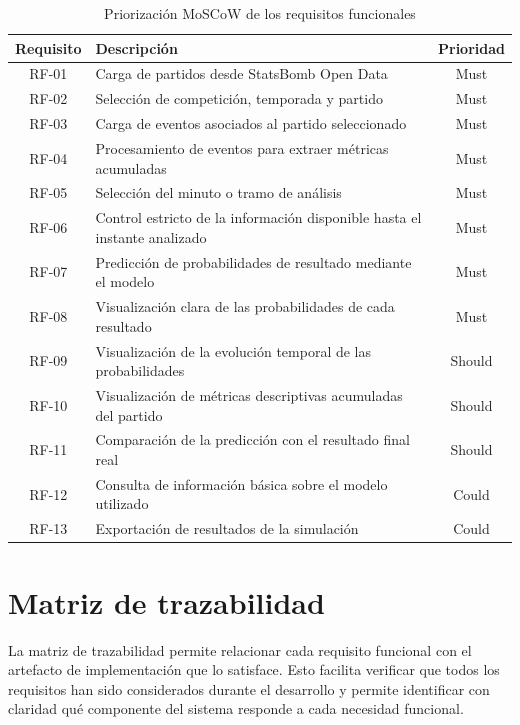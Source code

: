 \begin{table}[H]
    \centering
    \begin{tabularx}{\textwidth}{|c|X|c|}
        \hline
        \textbf{Requisito} & \textbf{Descripción} & \textbf{Prioridad} \\
        \hline
        RF-01 & Carga de partidos desde StatsBomb Open Data & Must \\
        RF-02 & Selección de competición, temporada y partido & Must \\
        RF-03 & Carga de eventos asociados al partido seleccionado & Must \\
        RF-04 & Procesamiento de eventos para extraer métricas acumuladas & Must \\
        RF-05 & Selección del minuto o tramo de análisis & Must \\
        RF-06 & Control estricto de la información disponible hasta el instante analizado & Must \\
        RF-07 & Predicción de probabilidades de resultado mediante el modelo & Must \\
        RF-08 & Visualización clara de las probabilidades de cada resultado & Must \\
        RF-09 & Visualización de la evolución temporal de las probabilidades & Should \\
        RF-10 & Visualización de métricas descriptivas acumuladas del partido & Should \\
        RF-11 & Comparación de la predicción con el resultado final real & Should \\
        RF-12 & Consulta de información básica sobre el modelo utilizado & Could \\
        RF-13 & Exportación de resultados de la simulación & Could \\
        \hline
    \end{tabularx}
    \caption{Priorización MoSCoW de los requisitos funcionales}
    \label{tab:moscow}
\end{table}

\section{Matriz de trazabilidad}

La matriz de trazabilidad permite relacionar cada requisito funcional con el artefacto de implementación que lo satisface. Esto facilita verificar que todos los requisitos han sido considerados durante el desarrollo y permite identificar con claridad qué componente del sistema responde a cada necesidad funcional.

